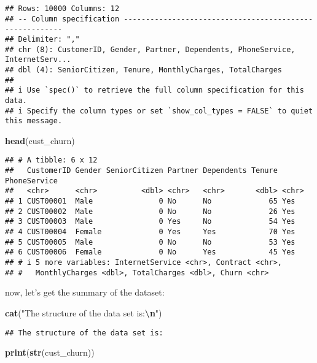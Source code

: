 \documentclass[
]{article}
\newenvironment{Shaded}{\begin{snugshade}}{\end{snugshade}}
\newcommand{\FunctionTok}[1]{\textcolor[rgb]{0.13,0.29,0.53}{\textbf{#1}}}
\newcommand{\NormalTok}[1]{#1}
\newcommand{\SpecialCharTok}[1]{\textcolor[rgb]{0.81,0.36,0.00}{\textbf{#1}}}
\newcommand{\StringTok}[1]{\textcolor[rgb]{0.31,0.60,0.02}{#1}}
\begin{document}
\begin{verbatim}
## Rows: 10000 Columns: 12
## -- Column specification --------------------------------------------------------
## Delimiter: ","
## chr (8): CustomerID, Gender, Partner, Dependents, PhoneService, InternetServ...
## dbl (4): SeniorCitizen, Tenure, MonthlyCharges, TotalCharges
## 
## i Use `spec()` to retrieve the full column specification for this data.
## i Specify the column types or set `show_col_types = FALSE` to quiet this message.
\end{verbatim}

\begin{Shaded}
\begin{Highlighting}[]
\FunctionTok{head}\NormalTok{(cust\_churn)}
\end{Highlighting}
\end{Shaded}

\begin{verbatim}
## # A tibble: 6 x 12
##   CustomerID Gender SeniorCitizen Partner Dependents Tenure PhoneService
##   <chr>      <chr>          <dbl> <chr>   <chr>       <dbl> <chr>       
## 1 CUST00001  Male               0 No      No             65 Yes         
## 2 CUST00002  Male               0 No      No             26 Yes         
## 3 CUST00003  Male               0 Yes     No             54 Yes         
## 4 CUST00004  Female             0 Yes     Yes            70 Yes         
## 5 CUST00005  Male               0 No      No             53 Yes         
## 6 CUST00006  Female             0 No      Yes            45 Yes         
## # i 5 more variables: InternetService <chr>, Contract <chr>,
## #   MonthlyCharges <dbl>, TotalCharges <dbl>, Churn <chr>
\end{verbatim}

now, let's get the summary of the dataset:

\begin{Shaded}
\begin{Highlighting}[]
\FunctionTok{cat}\NormalTok{(}\StringTok{"The structure of the data set is:}\SpecialCharTok{\textbackslash{}n}\StringTok{"}\NormalTok{)}
\end{Highlighting}
\end{Shaded}

\begin{verbatim}
## The structure of the data set is:
\end{verbatim}

\begin{Shaded}
\begin{Highlighting}[]
\FunctionTok{print}\NormalTok{(}\FunctionTok{str}\NormalTok{(cust\_churn))}
\end{Highlighting}
\end{Shaded}
\end{document}
